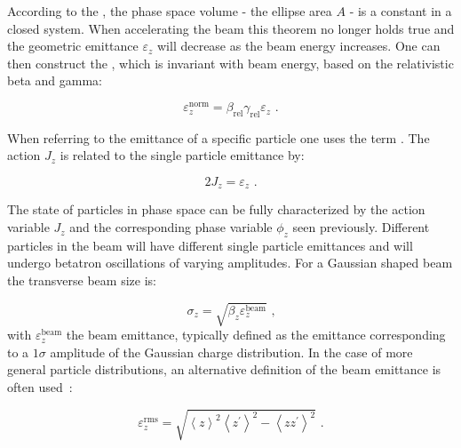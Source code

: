 According to the , the phase space volume - the ellipse area \(A\) - is a constant in a closed system.
When accelerating the beam this theorem no longer holds true and the geometric emittance \(\varepsilon_z\) will decrease as the beam energy increases.
One can then construct the , which is invariant with beam energy, based on the relativistic beta and gamma:

\begin{equation}
    \varepsilon_z^{\mathrm{norm}} = \beta_{\mathrm{rel}} \gamma_{\mathrm{rel}} \varepsilon_z \text{ .}
    \label{equation:normalized_emittance}
\end{equation}

When referring to the emittance of a specific particle one uses the term .
The \gls{action} \(J_z\) is related to the single particle emittance by:

\begin{equation}
    2 J_z = \varepsilon_z \text{ .}
    \label{equation:single_particle_action}
\end{equation}

The state of particles in phase space can be fully characterized by the action variable \(J_z\) and the corresponding phase variable \(\phi_z\) seen previously. 
Different particles in the beam will have different single particle emittances and will undergo betatron oscillations of varying amplitudes.
For a Gaussian shaped beam the transverse beam size is:

\begin{equation}
    \sigma_z = \sqrt{\beta_z \varepsilon_z^{\mathrm{beam}}} \text{ ,}
    \label{equation:gaussian_beam_transverse_beam_size}
\end{equation}
with \(\varepsilon_z^{\mathrm{beam}}\) the beam emittance, typically defined as the emittance corresponding to a \(1 \sigma\) amplitude of the Gaussian charge distribution.
In the case of more general particle distributions, an alternative definition of the beam emittance is often used~\cite{CERN:Muller:Beam_Matter_Covariance_Matrix_Emittance, CAS:BuonBeam_Phase_Space_Emittance}:

\begin{equation}
    \varepsilon_z^{\mathrm{rms}} = \sqrt{\left\langle z \right\rangle^{2} \left\langle z^{\prime} \right\rangle^{2} - \left\langle zz^{\prime} \right\rangle^{2}} \text{ .}
    \label{equation:beam_emittance_general}
\end{equation}

